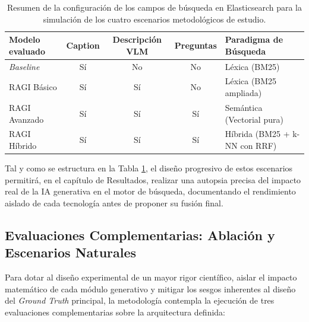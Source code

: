 \documentclass[a4paper]{report}
\begin{document}
\begin{table}[htbp]
    \centering
    \begin{tabular}{|l|c|c|c|l|}
        \hline
        \textbf{Modelo evaluado} & \textbf{Caption} & \textbf{Descripción VLM} & \textbf{Preguntas} & \textbf{Paradigma de Búsqueda} \\ \hline
        \textit{Baseline} & Sí & No & No & Léxica (BM25) \\ \hline
        RAGI Básico & Sí & Sí & No & Léxica (BM25 ampliada) \\ \hline
        RAGI Avanzado & Sí & Sí & Sí & Semántica (Vectorial pura) \\ \hline
        RAGI Híbrido & Sí & Sí & Sí & Híbrida (BM25 + k-NN con RRF) \\ \hline
    \end{tabular}
    \caption{Resumen de la configuración de los campos de búsqueda en Elasticsearch para la simulación de los cuatro escenarios metodológicos de estudio.}
    \label{tab:resumen_baselines}
\end{table}

Tal y como se estructura en la Tabla \ref{tab:resumen_baselines}, el diseño progresivo de estos escenarios permitirá, en el capítulo de Resultados, realizar una autopsia precisa del impacto real de la IA generativa en el motor de búsqueda, documentando el rendimiento aislado de cada tecnología antes de proponer su fusión final.

\subsection{Evaluaciones Complementarias: Ablación y Escenarios Naturales}
\label{subsec:ragi_evaluaciones_complementarias}

Para dotar al diseño experimental de un mayor rigor científico, aislar el impacto matemático de cada módulo generativo y mitigar los sesgos inherentes al diseño del \textit{Ground Truth} principal, la metodología contempla la ejecución de tres evaluaciones complementarias sobre la arquitectura definida:
\end{document}
